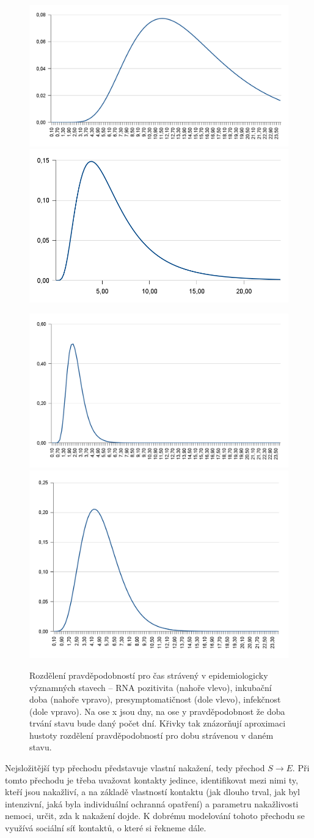 \begin{figure}%
\centerline{%
\includegraphics[width=0.49\columnwidth]{pic/time-rna}%
\includegraphics[width=0.49\columnwidth]{pic/time-ink}}
\centerline{%
\includegraphics[width=0.49\columnwidth]{pic/time-pre}%
\includegraphics[width=0.49\columnwidth]{pic/time-inf}%
}
\caption{Rozdělení pravděpodobností pro čas strávený v epidemiologicky významných stavech -- RNA pozitivita (nahoře vlevo), inkubační doba (nahoře vpravo), presymptomatičnost (dole vlevo), infekčnost (dole vpravo). Na ose x jsou dny, na ose y pravděpodobnost že doba trvání stavu bude daný počet dní. Křivky tak znázorňují aproximaci hustoty rozdělení pravděpodobností pro dobu strávenou v daném stavu.}%
\label{fig:times-states}%
\end{figure}

Nejsložitější typ přechodu představuje vlastní nakažení, tedy přechod $S\to E$. Při tomto přechodu je třeba uvažovat kontakty jedince, identifikovat mezi nimi ty, kteří jsou nakažliví, a na základě vlastností kontaktu (jak dlouho trval, jak byl intenzivní, jaká byla individuální ochranná opatření) a parametru nakažlivosti nemoci, určit, zda k nakažení dojde. K dobrému modelování tohoto přechodu se využívá sociální síť kontaktů, o které si řekneme dále. 

